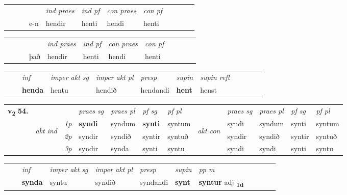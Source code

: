 \begin{tabular}{llllllllllll}
 & &  & &  \textit{ind praes} & \textit{ind pf} & \textit{con praes} & \textit{con pf} \\*
&  & & e-n & hendir & henti & hendi & henti \\*
\cmidrule{5-9}
\end{tabular}


\begin{tabular}{llllllllllll}
 & &  & &  \textit{ind praes} & \textit{ind pf} & \textit{con praes} & \textit{con pf} \\*
&  & & það & hendir & henti & hendi & henti \\*
\cmidrule{5-9}
\end{tabular}


\begin{tabular}{llllllllllll}
 & & \textit{inf} & \textit{imper akt sg} & \textit{imper akt pl}   & \textit{presp} & \textit{supin} & \textit{supin refl}      \\*
  & & \textbf{henda} & hentu  & hendið   & hendandi &  \textbf{hent} & henst  \\*
\cmidrule{1-12}
\end{tabular}



\begin{tabular}{llllllllllll} \toprule
\multirow{4}{*}{{{\textbf{v{\textsubscript{2}}} \Large{\textbf{54.}}}}}  & &   &  \textit{praes sg}  & \textit{praes pl}  &\textit{ pf sg} & \textit{pf pl} &  &  \textit{praes sg}  & \textit{praes pl}  & \textit{pf sg} & \textit{pf pl } \\*
	\cmidrule{4-7} \cmidrule{9-12}
 & \multirow{3}{*}{\begin{turn}{90}\textit{akt ind}\end{turn}} & {\textit{1p}} & \textbf{syndi} & syndum    & \textbf{synti} & syntum & \multirow{3}{*}{\begin{turn}{90}\textit{akt con}\end{turn}} &syndi & syndum & synti & syntum\\*
& &  {\textit{2p}} &  syndir  & syndið   & syntir & syntuð & & syndir & syndið & syntir & syntuð \\*
& &  {\textit{3p}} & syndir & synda   & synti & syntu & & syndi & syndi& synti & syntu  \\*
\cmidrule{4-7} \cmidrule{9-12}
\end{tabular}


\begin{tabular}{llllllllllll}
 & & \textit{inf} & \textit{imper akt sg} & \textit{imper akt pl}   & \textit{presp} & \textit{supin}  & \textit{pp m}     \\*
  & & \textbf{synda} & syntu  & syndið   & syndandi &  \textbf{synt}  & \textbf{syntur} adj \textbf{\textsubscript{1d}} \\*
\cmidrule{1-12}
\end{tabular}





